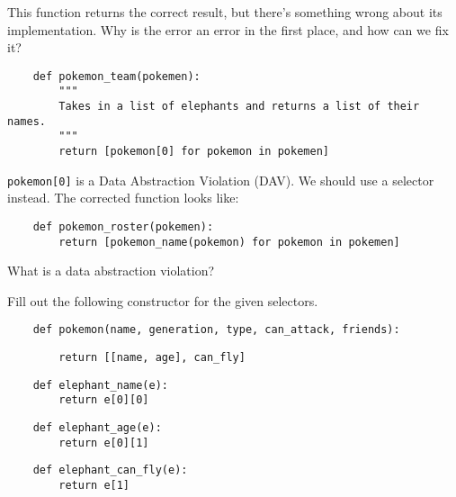     
    \begin{blocksection}
    \question This function returns the correct result, but there's something wrong
    about its implementation. Why is the error an error in the first place, and how can we fix it?
    
    \begin{lstlisting}
    def pokemon_team(pokemen):
        """
        Takes in a list of elephants and returns a list of their names.
        """
        return [pokemon[0] for pokemon in pokemen]
    \end{lstlisting}
    \begin{solution}[1in]
    \lstinline{pokemon[0]} is a Data Abstraction Violation (DAV).
    We should use a selector instead.
    The corrected function looks like:
    \begin{lstlisting}
    def pokemon_roster(pokemen):
        return [pokemon_name(pokemon) for pokemon in pokemen]
    \end{lstlisting}
    \end{solution}
    
    \end{blocksection}

    \begin{blocksection}
        \question What is a data abstraction violation?
    \end{blocksection}
    
    
    \begin{blocksection}
    \question Fill out the following constructor for the given selectors.
    
    \begin{lstlisting}
    def pokemon(name, generation, type, can_attack, friends):
    \end{lstlisting}
    \begin{solution}[1in]
    \begin{lstlisting}
        return [[name, age], can_fly]
    \end{lstlisting}
    \end{solution}
    
    \begin{lstlisting}
    def elephant_name(e):
        return e[0][0]
    \end{lstlisting}
    
    \begin{lstlisting}
    def elephant_age(e):
        return e[0][1]
    \end{lstlisting}
    
    \begin{lstlisting}
    def elephant_can_fly(e):
        return e[1]
    \end{lstlisting}
    
    \end{blocksection}
    
